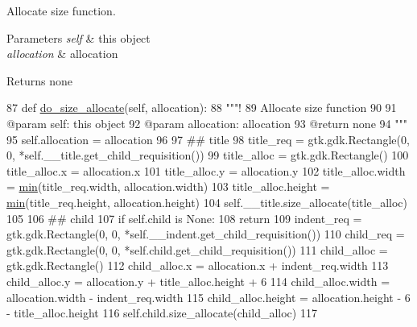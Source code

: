 Allocate size function. 


\begin{DoxyParams}{Parameters}
{\em self} & this object \\
\hline
{\em allocation} & allocation \\
\hline
\end{DoxyParams}
\begin{DoxyReturn}{Returns}
none 
\end{DoxyReturn}

\begin{DoxyCode}
87     \textcolor{keyword}{def }\hyperlink{classvisualizer_1_1higcontainer_1_1HIGContainer_a49ccf125b7707273f575c854d1f69ae9}{do\_size\_allocate}(self, allocation):
88         \textcolor{stringliteral}{"""!}
89 \textcolor{stringliteral}{         Allocate size function}
90 \textcolor{stringliteral}{        }
91 \textcolor{stringliteral}{        @param self: this object}
92 \textcolor{stringliteral}{        @param allocation: allocation}
93 \textcolor{stringliteral}{        @return none}
94 \textcolor{stringliteral}{        """}
95         self.allocation = allocation
96 
97         \textcolor{comment}{## title}
98         title\_req = gtk.gdk.Rectangle(0, 0, *self.\_\_title.get\_child\_requisition())
99         title\_alloc = gtk.gdk.Rectangle()
100         title\_alloc.x = allocation.x
101         title\_alloc.y = allocation.y
102         title\_alloc.width = \hyperlink{80211b_8c_ac6afabdc09a49a433ee19d8a9486056d}{min}(title\_req.width, allocation.width)
103         title\_alloc.height = \hyperlink{80211b_8c_ac6afabdc09a49a433ee19d8a9486056d}{min}(title\_req.height, allocation.height)
104         self.\_\_title.size\_allocate(title\_alloc)
105 
106         \textcolor{comment}{## child}
107         \textcolor{keywordflow}{if} self.child \textcolor{keywordflow}{is} \textcolor{keywordtype}{None}:
108             \textcolor{keywordflow}{return}
109         indent\_req = gtk.gdk.Rectangle(0, 0, *self.\_\_indent.get\_child\_requisition())
110         child\_req = gtk.gdk.Rectangle(0, 0, *self.child.get\_child\_requisition())
111         child\_alloc = gtk.gdk.Rectangle()
112         child\_alloc.x = allocation.x + indent\_req.width
113         child\_alloc.y = allocation.y + title\_alloc.height + 6
114         child\_alloc.width = allocation.width - indent\_req.width
115         child\_alloc.height = allocation.height - 6 - title\_alloc.height
116         self.child.size\_allocate(child\_alloc)
117 
\end{DoxyCode}
